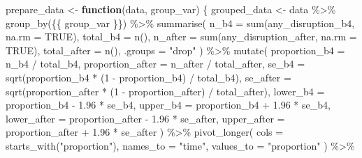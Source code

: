\documentclass[
  letterpaper,
  DIV=11,
  numbers=noendperiod]{scrartcl}
\newenvironment{Shaded}{\begin{snugshade}}{\end{snugshade}}
\newcommand{\AttributeTok}[1]{\textcolor[rgb]{0.40,0.45,0.13}{#1}}
\newcommand{\ConstantTok}[1]{\textcolor[rgb]{0.56,0.35,0.01}{#1}}
\newcommand{\ControlFlowTok}[1]{\textcolor[rgb]{0.00,0.23,0.31}{\textbf{#1}}}
\newcommand{\DecValTok}[1]{\textcolor[rgb]{0.68,0.00,0.00}{#1}}
\newcommand{\FloatTok}[1]{\textcolor[rgb]{0.68,0.00,0.00}{#1}}
\newcommand{\FunctionTok}[1]{\textcolor[rgb]{0.28,0.35,0.67}{#1}}
\newcommand{\NormalTok}[1]{\textcolor[rgb]{0.00,0.23,0.31}{#1}}
\newcommand{\OtherTok}[1]{\textcolor[rgb]{0.00,0.23,0.31}{#1}}
\newcommand{\SpecialCharTok}[1]{\textcolor[rgb]{0.37,0.37,0.37}{#1}}
\newcommand{\StringTok}[1]{\textcolor[rgb]{0.13,0.47,0.30}{#1}}
\begin{document}
\begin{Shaded}
\begin{Highlighting}[]
\NormalTok{prepare\_data }\OtherTok{\textless{}{-}} \ControlFlowTok{function}\NormalTok{(data, group\_var) \{}
\NormalTok{  grouped\_data }\OtherTok{\textless{}{-}}\NormalTok{ data }\SpecialCharTok{\%\textgreater{}\%}
    \FunctionTok{group\_by}\NormalTok{(\{\{ group\_var \}\}) }\SpecialCharTok{\%\textgreater{}\%}
    \FunctionTok{summarise}\NormalTok{(}
      \AttributeTok{n\_b4 =} \FunctionTok{sum}\NormalTok{(any\_disruption\_b4, }\AttributeTok{na.rm =} \ConstantTok{TRUE}\NormalTok{),}
      \AttributeTok{total\_b4 =} \FunctionTok{n}\NormalTok{(),}
      \AttributeTok{n\_after =} \FunctionTok{sum}\NormalTok{(any\_disruption\_after, }\AttributeTok{na.rm =} \ConstantTok{TRUE}\NormalTok{),}
      \AttributeTok{total\_after =} \FunctionTok{n}\NormalTok{(),}
      \AttributeTok{.groups =} \StringTok{"drop"}
\NormalTok{    ) }\SpecialCharTok{\%\textgreater{}\%}
    \FunctionTok{mutate}\NormalTok{(}
      \AttributeTok{proportion\_b4 =}\NormalTok{ n\_b4 }\SpecialCharTok{/}\NormalTok{ total\_b4,}
      \AttributeTok{proportion\_after =}\NormalTok{ n\_after }\SpecialCharTok{/}\NormalTok{ total\_after,}
      \AttributeTok{se\_b4 =} \FunctionTok{sqrt}\NormalTok{(proportion\_b4 }\SpecialCharTok{*}\NormalTok{ (}\DecValTok{1} \SpecialCharTok{{-}}\NormalTok{ proportion\_b4) }\SpecialCharTok{/}\NormalTok{ total\_b4),}
      \AttributeTok{se\_after =} \FunctionTok{sqrt}\NormalTok{(proportion\_after }\SpecialCharTok{*}\NormalTok{ (}\DecValTok{1} \SpecialCharTok{{-}}\NormalTok{ proportion\_after) }\SpecialCharTok{/}\NormalTok{ total\_after),}
      \AttributeTok{lower\_b4 =}\NormalTok{ proportion\_b4 }\SpecialCharTok{{-}} \FloatTok{1.96} \SpecialCharTok{*}\NormalTok{ se\_b4,}
      \AttributeTok{upper\_b4 =}\NormalTok{ proportion\_b4 }\SpecialCharTok{+} \FloatTok{1.96} \SpecialCharTok{*}\NormalTok{ se\_b4,}
      \AttributeTok{lower\_after =}\NormalTok{ proportion\_after }\SpecialCharTok{{-}} \FloatTok{1.96} \SpecialCharTok{*}\NormalTok{ se\_after,}
      \AttributeTok{upper\_after =}\NormalTok{ proportion\_after }\SpecialCharTok{+} \FloatTok{1.96} \SpecialCharTok{*}\NormalTok{ se\_after}
\NormalTok{    ) }\SpecialCharTok{\%\textgreater{}\%}
    \FunctionTok{pivot\_longer}\NormalTok{(}
      \AttributeTok{cols =} \FunctionTok{starts\_with}\NormalTok{(}\StringTok{"proportion"}\NormalTok{),}
      \AttributeTok{names\_to =} \StringTok{"time"}\NormalTok{,}
      \AttributeTok{values\_to =} \StringTok{"proportion"}
\NormalTok{    ) }\SpecialCharTok{\%\textgreater{}\%}

\end{Highlighting}
\end{Shaded}
\end{document}

